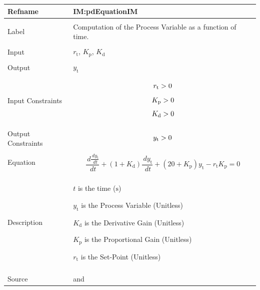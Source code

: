 \documentclass[12pt]{article}
\newcommand{\gt}{\ensuremath >}
\begin{document}
\vspace{\baselineskip}
\noindent
\begin{minipage}{\textwidth}
\begin{tabular}{>{\raggedright}p{}>{\raggedright\arraybackslash}p{}}
\toprule \textbf{Refname} & \textbf{IM:pdEquationIM}
\label{IM:pdEquationIM}
\\ \midrule \\
Label & Computation of the Process Variable as a function of time.
        
\\ \midrule \\
Input & ${r_{\text{t}}}$, ${K_{\text{p}}}$, ${K_{\text{d}}}$
        
\\ \midrule \\
Output & ${y_{\text{t}}}$
         
\\ \midrule \\
Input Constraints & \begin{displaymath}
                    {r_{\text{t}}}\gt{}0
                    \end{displaymath}
                    \begin{displaymath}
                    {K_{\text{p}}}\gt{}0
                    \end{displaymath}
                    \begin{displaymath}
                    {K_{\text{d}}}\gt{}0
                    \end{displaymath}
\\ \midrule \\
Output Constraints & \begin{displaymath}
                     {y_{\text{t}}}\gt{}0
                     \end{displaymath}
\\ \midrule \\
Equation & \begin{displaymath}
           \frac{\,d\frac{\,d{y_{\text{t}}}}{\,dt}}{\,dt}+\left(1+{K_{\text{d}}}\right) \frac{\,d{y_{\text{t}}}}{\,dt}+\left(20+{K_{\text{p}}}\right) {y_{\text{t}}}-{r_{\text{t}}} {K_{\text{p}}}=0
           \end{displaymath}
\\ \midrule \\
Description & \begin{symbDescription}
              \item{$t$ is the time (${\text{s}}$)}
              \item{${y_{\text{t}}}$ is the Process Variable (Unitless)}
              \item{${K_{\text{d}}}$ is the Derivative Gain (Unitless)}
              \item{${K_{\text{p}}}$ is the Proportional Gain (Unitless)}
              \item{${r_{\text{t}}}$ is the Set-Point (Unitless)}
              \end{symbDescription}
\\ \midrule \\
Source & \cite{abbasi2015} and \cite{johnson2008}
         

\end{tabular}
\end{minipage}
\end{document}
